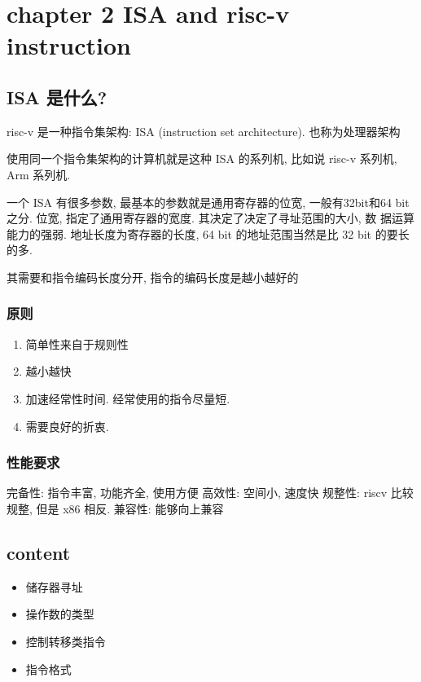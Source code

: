 \documentclass[11pt]{article}
\date{\today}
\title{}
\begin{document}
\tableofcontents

\section{chapter 2 ISA and risc-v instruction}
\label{sec:orgc045038}
\subsection{ISA 是什么?}
\label{sec:orgcf47ab8}

risc-v 是一种指令集架构: ISA (instruction set architecture). 也称为处理器架构

使用同一个指令集架构的计算机就是这种 ISA 的系列机, 比如说 risc-v 系列机, Arm 系列机.  


一个 ISA 有很多参数, 最基本的参数就是通用寄存器的位宽, 一般有32bit和64
bit之分. 位宽, 指定了通用寄存器的宽度. 其决定了决定了寻址范围的大小, 数
据运算能力的强弱. 地址长度为寄存器的长度, 64 bit 的地址范围当然是比 32
bit 的要长的多. 

其需要和指令编码长度分开, 指令的编码长度是越小越好的
\subsubsection{原则}
\label{sec:org9711222}

\begin{enumerate}
\item 简单性来自于规则性
\item 越小越快
\item 加速经常性时间.  经常使用的指令尽量短.
\item 需要良好的折衷.
\end{enumerate}

\subsubsection{性能要求}
\label{sec:orgee2f451}

完备性: 指令丰富, 功能齐全, 使用方便
高效性: 空间小, 速度快
规整性: riscv 比较规整, 但是 x86 相反. 
兼容性: 能够向上兼容

\subsection{content}
\label{sec:orgd6eacd6}

\begin{itemize}
\item 储存器寻址
\item 操作数的类型
\item 控制转移类指令
\item 指令格式
\end{itemize}
\end{document}
